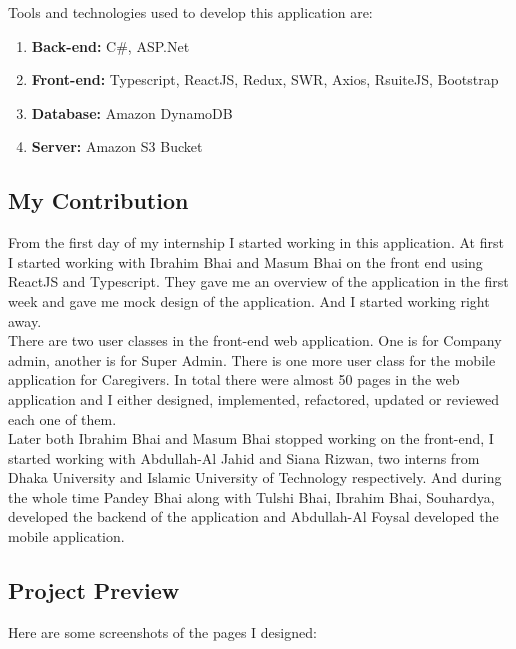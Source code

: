 Tools and technologies used to develop this application are:

\begin{enumerate}
    \item \textbf{Back-end:} C\#, ASP.Net
    \item \textbf{Front-end:} Typescript, ReactJS, Redux, SWR, Axios, RsuiteJS, Bootstrap
    \item \textbf{Database:} Amazon DynamoDB
    \item \textbf{Server:} Amazon S3 Bucket
\end{enumerate}

\subsection{My Contribution}

From the first day of my internship I started working in this application.
At first I started working with Ibrahim Bhai and Masum Bhai on the front end using ReactJS and Typescript.
They gave me an overview of the application in the first week and gave me mock design of the application.
And I started working right away.\\

There are two user classes in the front-end web application.
One is for Company admin, another is for Super Admin.
There is one more user class for the mobile application for Caregivers.
In total there were almost 50 pages in the web application and I either designed, implemented, refactored, updated or reviewed each one of them.\\

Later both Ibrahim Bhai and Masum Bhai stopped working on the front-end, I started working with Abdullah-Al Jahid and Siana Rizwan, two interns from Dhaka University and Islamic University of Technology respectively.
And during the whole time Pandey Bhai along with Tulshi Bhai, Ibrahim Bhai, Souhardya, developed the backend of the application and Abdullah-Al Foysal developed the mobile application.

\subsection{Project Preview}

Here are some screenshots of the pages I designed:

\setlength{\tabcolsep}{4pt}

